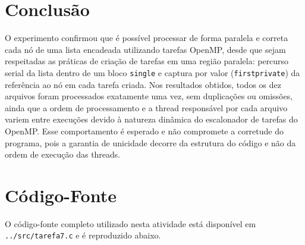 \documentclass[a4paper,12pt]{article}
\begin{document}
\section{Conclusão}

O experimento confirmou que é possível processar de forma paralela e correta cada nó de uma lista encadeada utilizando tarefas OpenMP, desde que sejam respeitadas as práticas de criação de tarefas em uma região paralela: percurso serial da lista dentro de um bloco \texttt{single} e captura por valor (\texttt{firstprivate}) da referência ao nó em cada tarefa criada. Nos resultados obtidos, todos os dez arquivos foram processados exatamente uma vez, sem duplicações ou omissões, ainda que a ordem de processamento e a thread responsável por cada arquivo variem entre execuções devido à natureza dinâmica do escalonador de tarefas do OpenMP. Esse comportamento é esperado e não compromete a corretude do programa, pois a garantia de unicidade decorre da estrutura do código e não da ordem de execução das threads.

\newpage
\appendix

\section{Código-Fonte}
\label{sec:codigo}

O código-fonte completo utilizado nesta atividade está disponível em \texttt{../src/tarefa7.c} e é reproduzido abaixo.


\end{document}

